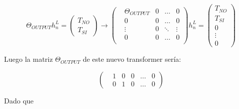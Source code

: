 \documentclass{article}
\begin{document}
\begin{equation*}
    \Theta_{OUTPUT}h_n^L =   
    \left(\begin{matrix}
        T_{NO} \\
        T_{SI}
    \end{matrix}\right) \longrightarrow
    \left(\begin{matrix}
        &\Theta_{OUTPUT} &0 &\dots  &0 \\
        &0                &0 &\dots  &0 \\
        &\vdots           &0 &\ddots &\vdots \\
        &0                &0 &\dots  &0 \\
    \end{matrix}\right)h_n^L = 
    \left(\begin{matrix}
        T_{NO} \\
        T_{SI} \\ 
        0 \\
        \vdots \\
        0
    \end{matrix}\right)
\end{equation*}


Luego la matriz $\Theta_{OUTPUT}$ de este nuevo transformer sería:

\begin{equation*}
    \left(\begin{matrix}
        &1 &0 &0 &\dots &0 \\
        &0 &1 &0 &\dots &0 
    \end{matrix}\right)
\end{equation*}

Dado que 
\end{document}
